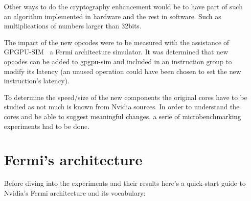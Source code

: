 \documentclass{report}
\begin{document}
    Other ways to do the cryptography enhancement would be to have part of such
    an algorithm implemented in hardware and the rest in software.
    Such as multiplications of numbers larger than 32bits.
    

    The impact of the new opcodes were to be measured with the assistance of
    GPGPU-SIM~\cite{gpgpusim09} a Fermi architecture simulator. It was determined
    that new opcodes can be added to gpgpu-sim and included in an instruction group
    to modify its latency (an unused operation could have been chosen to set the new
    instruction's latency).

    To determine the speed/size of the new components the original cores have to
    be studied as not much is known from Nvidia sources. In order to understand 
    the cores and be able to suggest meaningful changes, a serie of microbenchmarking 
    experiments had to be done. 


\chapter{Fermi's architecture}
    Before diving into the experiments and their results here's a quick-start
    guide to Nvidia's Fermi architecture and its vocabulary:
\end{document}

